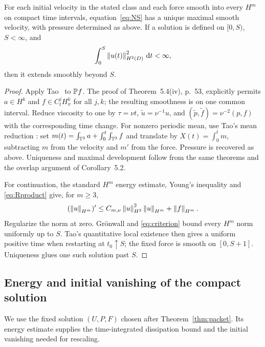 \begin{proposition}
\label{prop:local}\label{lem:Rlocal}
For each initial velocity in the stated class and each force smooth into
every $H^m$ on compact time intervals, equation~\eqref{eq:NS} has a unique
maximal smooth velocity, with pressure determined as above. If a solution
is defined on $[0,S)$, $S<\infty$, and
\begin{equation}\label{eq:criterion}
 \int_0^S\left\lVert u(t)\right\rVert_{H^2(D)}^2\,\mathrm d t<\infty,
\end{equation}
then it extends smoothly beyond $S$.
\end{proposition}
\begin{proof}
Apply Tao~\cite[Theorems~5.1(ii)--(iv), 5.4(ii)--(iv)]{tao2013} to
$\mathbb P f$. The proof of Theorem~5.4(iv), p.~53, explicitly permits
$a\in H^k$ and $f\in C^j_tH^k_x$ for all $j,k$; the resulting smoothness
is on one common interval. Reduce viscosity to one by
$\tau=\nu t$, $\widetilde u=\nu^{-1}u$, and
$(\widetilde p,\widetilde f)=\nu^{-2}(p,f)$ with the corresponding time change.
For nonzero periodic mean, use Tao's mean reduction
\cite[Section~3, (36)--(38)]{tao2013}: set
$m(t)=\int_{\mathbb T^3}a+\int_0^t\int_{\mathbb T^3}f$ and translate by
$X(t)=\int_0^t m$, subtracting $m$ from the velocity and $m'$ from the force.
Pressure is recovered as above. Uniqueness and maximal development follow
from the same theorems and the overlap argument of Corollary~5.2.

For continuation, the standard $H^m$ energy estimate, Young's inequality
and \eqref{eq:Rproduct} give, for $m\ge3$,
\begin{equation}\label{eq:highcontinuation}
 (\left\lVert u\right\rVert_{H^m})'\le C_{m,\nu}\left\lVert u\right\rVert_{H^2}^2\left\lVert u\right\rVert_{H^m}
                         +\left\lVert f\right\rVert_{H^m}.
\end{equation}
Regularize the norm at zero. Gr\"onwall and \eqref{eq:criterion} bound
every $H^m$ norm uniformly up to $S$. Tao's quantitative local existence
then gives a uniform positive time when restarting at $t_0\uparrow S$;
the fixed force is smooth on $[0,S+1]$. Uniqueness glues one such solution
past $S$.
\end{proof}

\subsection{Energy and initial vanishing of the compact solution}
We use the fixed solution $(U,P,F)$ chosen after
Theorem~\ref{thm:packet}. Its energy estimate supplies the time-integrated
dissipation bound and the initial vanishing needed for rescaling.


